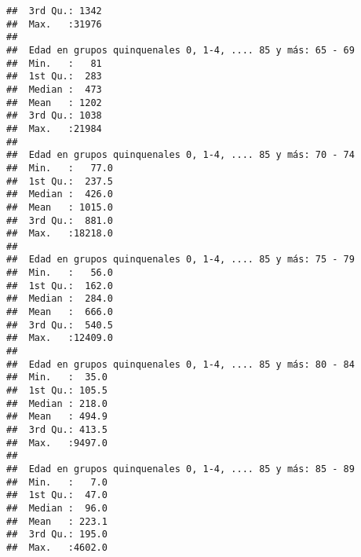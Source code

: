 \documentclass[11pt,]{article}
\begin{document}
\begin{verbatim}
##  3rd Qu.: 1342                                             
##  Max.   :31976                                             
##                                                            
##  Edad en grupos quinquenales 0, 1-4, .... 85 y más: 65 - 69
##  Min.   :   81                                             
##  1st Qu.:  283                                             
##  Median :  473                                             
##  Mean   : 1202                                             
##  3rd Qu.: 1038                                             
##  Max.   :21984                                             
##                                                            
##  Edad en grupos quinquenales 0, 1-4, .... 85 y más: 70 - 74
##  Min.   :   77.0                                           
##  1st Qu.:  237.5                                           
##  Median :  426.0                                           
##  Mean   : 1015.0                                           
##  3rd Qu.:  881.0                                           
##  Max.   :18218.0                                           
##                                                            
##  Edad en grupos quinquenales 0, 1-4, .... 85 y más: 75 - 79
##  Min.   :   56.0                                           
##  1st Qu.:  162.0                                           
##  Median :  284.0                                           
##  Mean   :  666.0                                           
##  3rd Qu.:  540.5                                           
##  Max.   :12409.0                                           
##                                                            
##  Edad en grupos quinquenales 0, 1-4, .... 85 y más: 80 - 84
##  Min.   :  35.0                                            
##  1st Qu.: 105.5                                            
##  Median : 218.0                                            
##  Mean   : 494.9                                            
##  3rd Qu.: 413.5                                            
##  Max.   :9497.0                                            
##                                                            
##  Edad en grupos quinquenales 0, 1-4, .... 85 y más: 85 - 89
##  Min.   :   7.0                                            
##  1st Qu.:  47.0                                            
##  Median :  96.0                                            
##  Mean   : 223.1                                            
##  3rd Qu.: 195.0                                            
##  Max.   :4602.0                                            

\end{verbatim}
\end{document}
